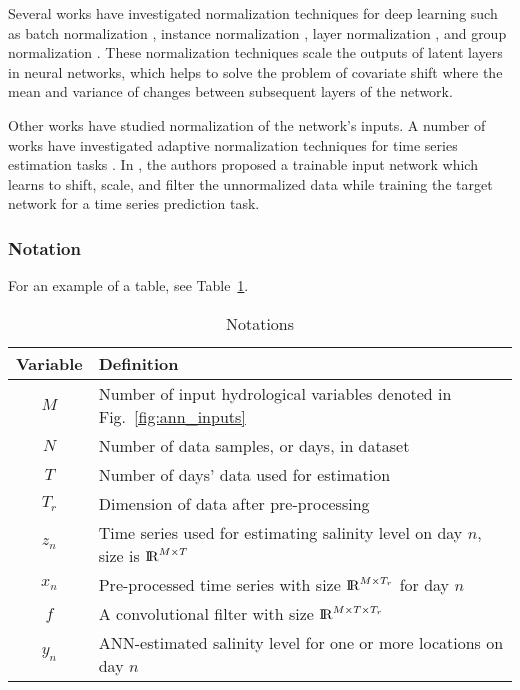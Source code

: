 Several works have investigated normalization techniques for deep learning such as batch normalization \cite{ref:ioffe2015batch}, instance normalization \cite{ref:huang2017instance}, layer normalization \cite{ref:ba2016layer}, and group normalization \cite{ref:wu2018group}. These normalization techniques scale the outputs of latent layers in neural networks, which helps to solve the problem of covariate shift \cite{ref:ioffe2015batch} where the mean and variance of changes between subsequent layers of the network.

Other works have studied normalization of the network's inputs. A number of works have investigated adaptive normalization techniques for time series estimation tasks \cite{ref:ogasawara2010adaptive, ref:nayak2014impact, ref:shao2015self}. In \cite{ref:passalis2019dain}, the authors proposed a trainable input network which learns to shift, scale, and filter the unnormalized data while training the target network for a time series prediction task.

\subsubsection{Notation}

For an example of a table, see Table~\ref{table:notation}.

\begin{table}[htb]
	\caption{Notations}
	\label{table:notation}
	\centering
	\begin{tabular}[]{c|l}
		\toprule
		Variable & Definition \\
		\midrule
		$M$ & Number of input hydrological variables denoted in Fig.~\ref{fig:ann_inputs}\\
		\hline
		$N$ & Number of data samples, or days, in dataset \\
		\hline
		$T$ & Number of days' data used for estimation \\
		\hline
		$T_r$ & Dimension of data after pre-processing\\
		\hline
		$z_{n}$ & Time series used for estimating salinity level on day $n$, size is ${\rm I\!R}^{M\times T}$ \\
		\hline
		$x_{n}$ & Pre-processed time series with size ${\rm I\!R}^{M\times T_r}$ for day $n$\\
		\hline
		$f$ & A convolutional filter with size ${\rm I\!R}^{M \times T \times T_r}$ \\
		\hline
		$y_{n}$ & ANN-estimated salinity level for one or more locations on day $n$ \\
		\bottomrule
	\end{tabular}
\end{table}

